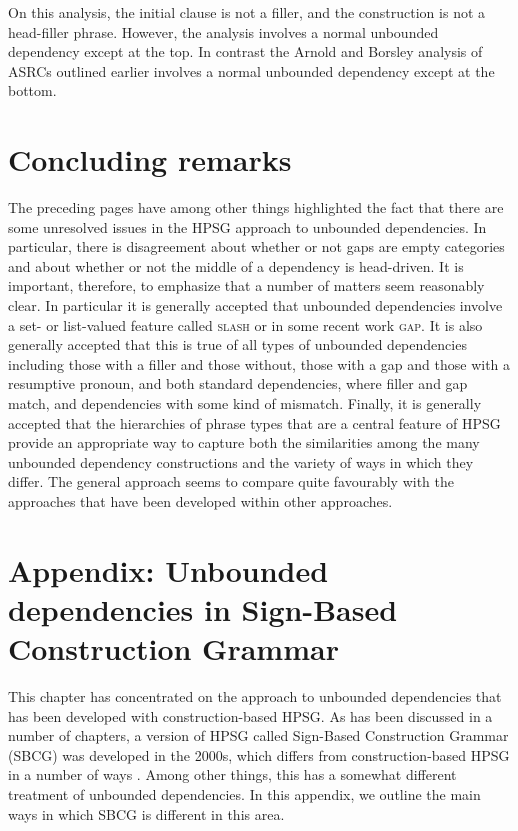 \documentclass[output=paper
                ,modfonts
                ,nonflat
	        ,collection
	        ,collectionchapter
	        ,collectiontoclongg
 	        ,biblatex
                ,babelshorthands
                ,newtxmath
                ,draftmode
                ,colorlinks, citecolor=brown
]{./langsci/langscibook}
\begin{document}
{\noindent
On this analysis, the initial clause is not a filler, and the
construction is not a head-filler phrase. However, the analysis involves
a normal unbounded dependency except at the top. In contrast the Arnold
and Borsley analysis of ASRCs outlined earlier involves a normal
unbounded dependency except at the bottom.


\section{Concluding remarks}
\label{sec:UDC:ConcludingRemarks}

The preceding pages have among other things highlighted the fact that
there are some unresolved issues in the HPSG approach to unbounded
dependencies. In particular, there is disagreement about whether or
not gaps are empty categories and about whether or not the middle of a
dependency is head-driven. It is important, therefore, to emphasize
that a number of matters seem reasonably clear. In particular it is
generally accepted that unbounded dependencies involve a set- or
list-valued feature called \textsc{slash} or in some recent work \textsc{gap}. It is
also generally accepted that this is true of all types of unbounded
dependencies including those with a filler and those without, those
with a gap and those with a resumptive pronoun, and both standard
dependencies, where filler and gap match, and dependencies with some
kind of mismatch. Finally, it is generally accepted that the
hierarchies of phrase types that are a central feature of HPSG provide
an appropriate way to capture both the similarities among the many
unbounded dependency constructions and the variety of ways in which
they differ. The general approach seems to compare quite favourably
with the approaches that have been developed within other approaches.

\section*{Appendix: Unbounded dependencies in Sign-Based Construction Grammar}

This chapter has concentrated on the approach to unbounded dependencies that has been developed with construction-based HPSG. As has been discussed in a number of chapters, a version of HPSG called Sign-Based Construction Grammar (SBCG) was developed in the 2000s, which differs from construction-based HPSG in a number of ways \citep{Sag:12}. Among other things, this has a somewhat different treatment of unbounded dependencies. In this appendix, we outline the main ways in which SBCG is different in this area.

}
\end{document}
